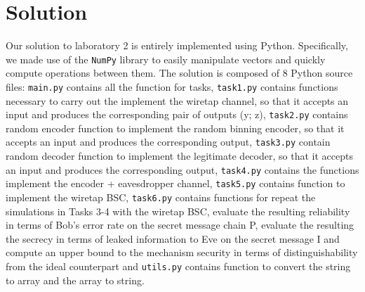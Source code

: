 \documentclass{report}
\begin{document}
\chapter*{Solution}
\par Our solution to laboratory 2 is entirely implemented using Python. Specifically, we made use of the {\tt NumPy} library to easily manipulate vectors and quickly compute operations between them. The solution is composed of 8 Python source files: {\tt main.py} contains all the function for tasks, {\tt task1.py} contains functions necessary to carry out the implement the wiretap channel, so that it accepts an
input  and produces the corresponding pair of outputs (y; z), {\tt task2.py} contains random encoder function to implement the random binning encoder, so that it accepts an input and produces the corresponding output, {\tt task3.py} contain random decoder function to implement the legitimate decoder, so that it accepts an input and produces the corresponding output,  {\tt task4.py} contains the functions implement the encoder + eavesdropper channel, {\tt task5.py}  contains function to implement the wiretap BSC, {\tt task6.py} contains functions for repeat the simulations in Tasks 3-4 with the wiretap BSC, evaluate the resulting reliability in terms of Bob's error rate on the secret message chain P, evaluate the resulting the secrecy in terms of leaked information to Eve on the secret message I and compute an upper bound to the mechanism security in terms of distinguishability from the ideal
counterpart and {\tt utils.py} contains function to convert the string to array and the array to string. 
\end{document}
